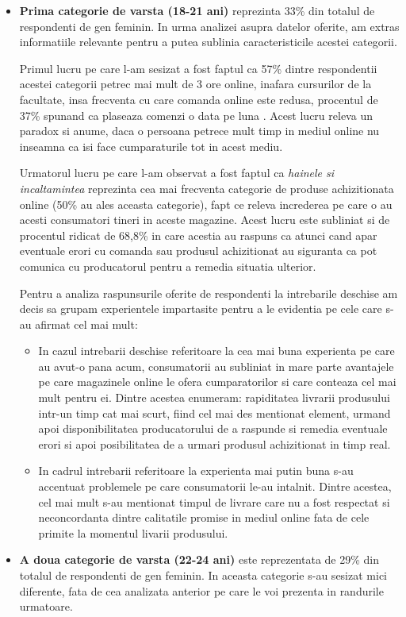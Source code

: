 \documentclass[a4paper, 12pt]{article}
\begin{document}
	
	\begin{itemize}
		\item \textbf{Prima categorie de varsta (18-21 ani)} reprezinta 33\% din totalul de respondenti de gen feminin. In  urma analizei asupra datelor oferite, am extras informatiile relevante pentru a putea sublinia caracteristicile acestei categorii. 
		
		\quad Primul lucru pe care l-am sesizat a fost faptul ca 57\% dintre respondentii acestei categorii petrec mai mult de 3 ore online, inafara cursurilor de la facultate, insa frecventa cu care comanda online este redusa, procentul de  37\% spunand ca plaseaza comenzi o data pe luna . Acest lucru releva un paradox si anume, daca o persoana petrece mult timp in mediul online nu inseamna ca isi face cumparaturile tot in acest mediu.
		
		\quad Urmatorul lucru pe care l-am observat a fost faptul ca\textit{ hainele si incaltamintea} reprezinta cea mai frecventa categorie de produse achizitionata online (50\% au ales aceasta categorie),  fapt ce releva increderea pe care o au acesti consumatori tineri in aceste magazine. Acest lucru este subliniat si de procentul ridicat de 68,8\% in care acestia au raspuns ca atunci cand apar eventuale erori cu comanda sau produsul achizitionat au siguranta ca pot comunica cu producatorul pentru a remedia situatia ulterior. 
		
		\quad Pentru a analiza raspunsurile oferite de respondenti la intrebarile deschise am decis sa grupam experientele impartasite pentru a le evidentia pe cele care s-au afirmat cel mai mult:
		\begin{itemize}
			\item In cazul intrebarii deschise referitoare la cea mai buna experienta pe care au avut-o pana acum, consumatorii au subliniat in mare parte avantajele pe care magazinele online le ofera cumparatorilor si care conteaza cel mai mult pentru ei. Dintre acestea enumeram: rapiditatea livrarii produsului intr-un timp cat mai scurt, fiind cel mai des mentionat element, urmand apoi disponibilitatea producatorului de a raspunde si remedia eventuale erori si apoi posibilitatea de a urmari produsul achizitionat in timp real.
			\item 	In cadrul intrebarii referitoare la experienta mai putin buna s-au accentuat problemele pe care consumatorii le-au intalnit. Dintre acestea, cel mai mult s-au mentionat timpul de livrare care nu a fost respectat si neconcordanta dintre calitatile promise in mediul online fata de cele primite la momentul livarii produsului. 
		\end{itemize}
		\item \textbf{A doua categorie de varsta (22-24 ani)} este reprezentata de 29\% din totalul de respondenti de gen feminin. In aceasta categorie s-au sesizat mici diferente, fata de cea analizata anterior pe care le voi prezenta in randurile urmatoare.
		

\end{itemize}
\end{document}
